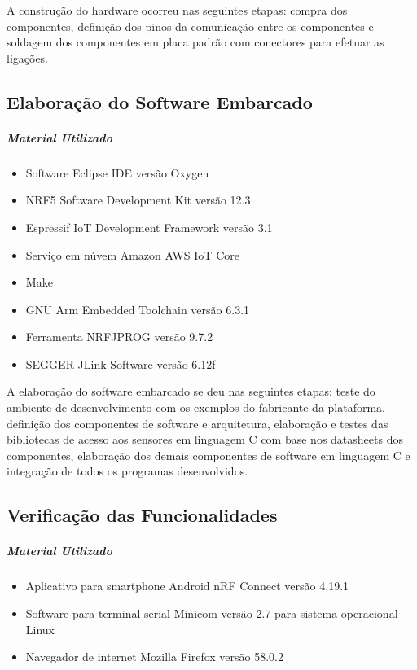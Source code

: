 A construção do hardware ocorreu nas seguintes etapas: compra dos
componentes, definição dos pinos da comunicação entre os componentes e soldagem
dos componentes em placa padrão com conectores para efetuar as ligações.


\subsection{Elaboração do Software Embarcado}

\subparagraph{Material Utilizado}
\begin{itemize}[noitemsep]
  \item Software Eclipse IDE versão Oxygen
  \item NRF5 Software Development Kit versão 12.3
  \item Espressif IoT Development Framework versão 3.1
  \item Serviço em núvem Amazon AWS IoT Core
  \item Make
  \item GNU Arm Embedded Toolchain versão 6.3.1
  \item Ferramenta NRFJPROG versão 9.7.2
  \item SEGGER JLink Software versão 6.12f
\end{itemize}

A elaboração do software embarcado se deu nas seguintes etapas: teste do
ambiente de desenvolvimento com os exemplos do fabricante da plataforma,
definição dos componentes de software e arquitetura, elaboração e testes das
bibliotecas de acesso aos sensores em linguagem C com base nos datasheets dos
componentes, elaboração dos demais componentes de software em linguagem C e
integração de todos os programas desenvolvidos.

\subsection{Verificação das Funcionalidades}

\subparagraph{Material Utilizado}
\begin{itemize}[noitemsep]
  \item Aplicativo para smartphone Android nRF Connect versão 4.19.1
  \item Software para terminal serial Minicom versão 2.7 para sistema
  operacional Linux
  \item Navegador de internet Mozilla Firefox versão 58.0.2
\end{itemize}

